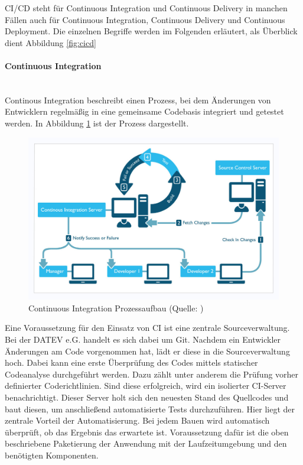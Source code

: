 CI/CD steht für \glqq Continuous Integration und Continuous Delivery\grqq{} in manchen Fällen auch für \glqq Continuous Integration, Continuous Delivery und Continuous Deployment\grqq{}.
Die einzelnen Begriffe werden im Folgenden erläutert, als Überblick dient Abbildung \ref{fig:cicd}
\paragraph{\glqq Continuous Integration\grqq}~\\
Continous Integration beschreibt einen Prozess, bei dem Änderungen von Entwicklern regelmäßig in eine gemeinsame Codebasis integriert und getestet werden.
In Abbildung \ref{fig:ci} ist der Prozess dargestellt.
\begin{figure}[h]
	\centering
	\includegraphics[width=\textwidth]{figures/CI.png}
	\caption{Continuous Integration Prozessaufbau (Quelle: \cite{.25.2.2020e})}
	\label{fig:ci}
\end{figure}
Eine Voraussetzung für den Einsatz von CI ist eine zentrale Sourceverwaltung.
Bei der DATEV e.G. handelt es sich dabei um Git.
Nachdem ein Entwickler Änderungen am Code vorgenommen hat, lädt er diese in die Sourceverwaltung hoch.
Dabei kann eine erste Überprüfung des Codes mittels statischer Codeanalyse durchgeführt werden.
Dazu zählt unter anderem die Prüfung vorher definierter Coderichtlinien.
Sind diese erfolgreich, wird ein isolierter CI-Server benachrichtigt.
Dieser Server holt sich den neuesten Stand des Quellcodes und baut diesen, um anschließend automatisierte Tests durchzuführen.
Hier liegt der zentrale Vorteil der Automatisierung. 
Bei jedem Bauen wird automatisch überprüft, ob das Ergebnis das erwartete ist.
Voraussetzung dafür ist die oben beschriebene Paketierung der Anwendung mit der Laufzeitumgebung und den benötigten Komponenten. 

